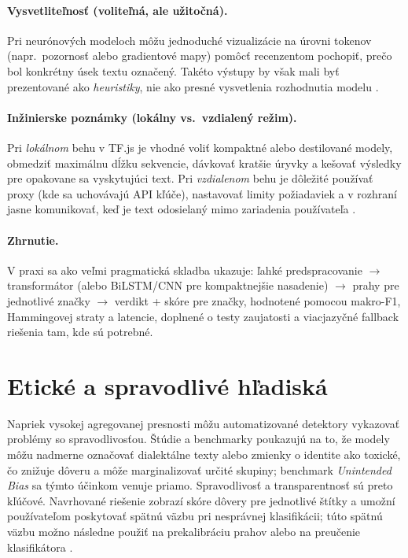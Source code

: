\paragraph{Vysvetliteľnosť (voliteľná, ale užitočná).}
Pri neurónových modeloch môžu jednoduché vizualizácie na úrovni tokenov (napr.\ pozornosť alebo gradientové mapy) pomôcť recenzentom pochopiť, prečo bol konkrétny úsek textu označený. Takéto výstupy by však mali byť prezentované ako \emph{heuristiky}, nie ako presné vysvetlenia rozhodnutia modelu \cite{hatexplain2021}.

\paragraph{Inžinierske poznámky (lokálny vs.\ vzdialený režim).}
Pri \emph{lokálnom} behu v TF.js je vhodné voliť kompaktné alebo destilované modely, obmedziť maximálnu dĺžku sekvencie, dávkovať kratšie úryvky a kešovať výsledky pre opakovane sa vyskytujúci text. Pri \emph{vzdialenom} behu je dôležité používať proxy (kde sa uchovávajú API kľúče), nastavovať limity požiadaviek a v rozhraní jasne komunikovať, keď je text odosielaný mimo zariadenia používateľa \cite{tfjsToxicity}\cite{chromemv3}\cite{distilbert2019}.

\paragraph{Zhrnutie.}
V praxi sa ako veľmi pragmatická skladba ukazuje: ľahké predspracovanie \(\rightarrow\) transformátor (alebo BiLSTM/CNN pre kompaktnejšie nasadenie) \(\rightarrow\) prahy pre jednotlivé značky \(\rightarrow\) verdikt + skóre pre značky, hodnotené pomocou makro-F1, Hammingovej straty a latencie, doplnené o testy zaujatosti a viacjazyčné fallback riešenia tam, kde sú potrebné.

\section{Etické a spravodlivé hľadiská}
Napriek vysokej agregovanej presnosti môžu automatizované detektory vykazovať problémy so spravodlivosťou. Štúdie a benchmarky poukazujú na to, že modely môžu nadmerne označovať dialektálne texty alebo zmienky o identite ako toxické, čo znižuje dôveru a môže marginalizovať určité skupiny; benchmark \emph{Unintended Bias} sa týmto účinkom venuje priamo. Spravodlivosť a transparentnosť sú preto kľúčové. Navrhované riešenie zobrazí skóre dôvery pre jednotlivé štítky a umožní používateľom poskytovať spätnú väzbu pri nesprávnej klasifikácii; túto spätnú väzbu možno následne použiť na prekalibráciu prahov alebo na preučenie klasifikátora \cite{jigsaw2019bias}\cite{borkan2019nuanced}\cite{dixon2018bias}\cite{sap2019racialbias}\cite{guo2017calibration}.

